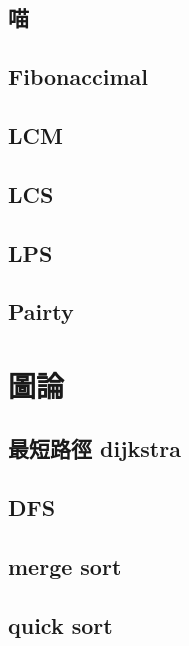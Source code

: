     \subsection{喵}
        
    \subsection{Fibonaccimal}
        
    \subsection{LCM}
        
    \subsection{LCS}
        
    \subsection{LPS}
        
    \subsection{Pairty}
        

\section{圖論}
    \subsection{最短路徑 dijkstra}
        
    \subsection{DFS}
        
    \subsection{merge sort}
          
    \subsection{quick sort}
        
